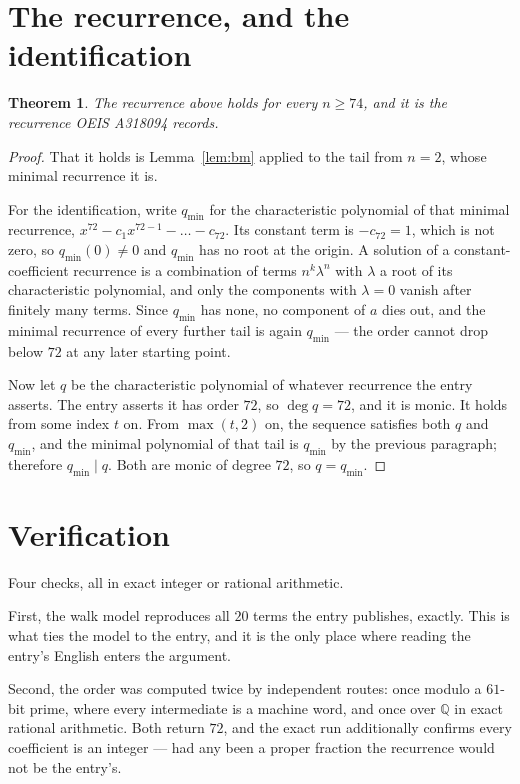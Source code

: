 \documentclass[11pt,a4paper]{article}
\theoremstyle{plain}
\newtheorem{theorem}{Theorem}
\theoremstyle{definition}
\begin{document}
\section{The recurrence, and the identification}

\begin{theorem}
The recurrence above holds for every $n\ge74$, and it is the recurrence OEIS A318094 records.
\end{theorem}

\begin{proof}
That it holds is Lemma~\ref{lem:bm} applied to the tail from $n=2$, whose minimal
recurrence it is.

For the identification, write $q_{\min}$ for the characteristic polynomial of that minimal
recurrence, $x^{72}-c_1x^{72-1}-\dots-c_{72}$. Its constant term is
$-c_{72}=1$, which is not zero, so $q_{\min}(0)\neq0$ and $q_{\min}$ has no
root at the origin. A solution of a constant-coefficient recurrence is a combination of terms
$n^{k}\lambda^{n}$ with $\lambda$ a root of its characteristic polynomial, and only the
components with $\lambda=0$ vanish after finitely many terms. Since $q_{\min}$ has none, no
component of $a$ dies out, and the minimal recurrence of every further tail is again
$q_{\min}$ --- the order cannot drop below $72$ at any later starting point.

Now let $q$ be the characteristic polynomial of whatever recurrence the entry asserts. The
entry asserts it has order $72$, so $\deg q=72$, and it is monic. It holds from some
index $t$ on. From $\max(t,2)$ on, the sequence satisfies both $q$ and $q_{\min}$, and
the minimal polynomial of that tail is $q_{\min}$ by the previous paragraph; therefore
$q_{\min}\mid q$. Both are monic of degree $72$, so $q=q_{\min}$.
\end{proof}

\section{Verification}

Four checks, all in exact integer or rational arithmetic.

First, the walk model reproduces all $20$ terms the entry publishes, exactly. This is
what ties the model to the entry, and it is the only place where reading the entry's English
enters the argument.

Second, the order was computed twice by independent routes: once modulo a $61$-bit prime, where
every intermediate is a machine word, and once over $\mathbb{Q}$ in exact rational arithmetic.
Both return $72$, and the exact run additionally confirms every coefficient is an integer
--- had any been a proper fraction the recurrence would not be the entry's.
\end{document}
